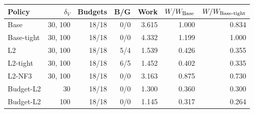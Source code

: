 \begin{tabular}{lrrrrrr}
\toprule
Policy & $\delta_V$ & Budgets & B/G & Work & $W/W_{\rm Base}$ & $W/W_{\rm Base\text{-}tight}$\\
\midrule
Base & 30, 100 & 18/18 & 0/0 & 3.615 & 1.000 & 0.834\\
Base-tight & 30, 100 & 18/18 & 0/0 & 4.332 & 1.199 & 1.000\\
L2 & 30, 100 & 18/18 & 5/4 & 1.539 & 0.426 & 0.355\\
L2-tight & 30, 100 & 18/18 & 6/5 & 1.452 & 0.402 & 0.335\\
L2-NF3 & 30, 100 & 18/18 & 0/0 & 3.163 & 0.875 & 0.730\\
Budget-L2 & 30 & 18/18 & 0/0 & 1.300 & 0.360 & 0.300\\
Budget-L2 & 100 & 18/18 & 0/0 & 1.145 & 0.317 & 0.264\\
\bottomrule
\end{tabular}
